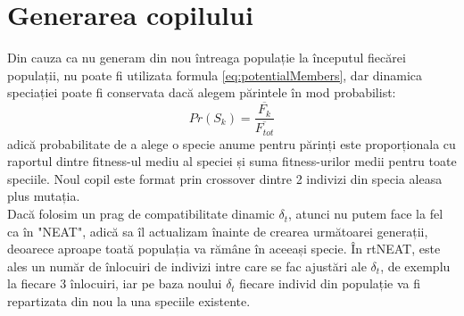 \section{Generarea copilului}
Din cauza ca nu generam din nou întreaga populație la începutul fiecărei populații, nu poate fi utilizata formula \ref{eq:potentialMembers}, dar dinamica speciației poate fi conservata dacă alegem părintele în mod probabilist:
\begin{equation}\label{eq:chooseParentSpecies}
    Pr(S_k) = \frac{\overline{F_k}}{\overline{F_{tot}}}
\end{equation} 
adică probabilitate de a alege o specie anume pentru părinți este proporționala cu raportul dintre fitness-ul mediu al speciei și suma fitness-urilor medii pentru toate speciile.
Noul copil este format prin crossover dintre 2 indivizi din specia aleasa plus mutația.
\\
Dacă folosim un prag de compatibilitate dinamic $\delta_t$, atunci nu putem face la fel ca în "NEAT", adică sa îl actualizam înainte de crearea următoarei generații, deoarece aproape toată populația va rămâne în aceeași specie.
În rtNEAT, este ales un număr de înlocuiri de indivizi intre care se fac ajustări ale $\delta_t$, de exemplu la fiecare 3 înlocuiri, iar pe baza noului $\delta_t$ fiecare individ din populație va fi repartizata din nou la una speciile existente.

